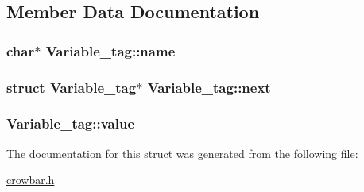 \subsection{Member Data Documentation}
\hypertarget{struct_variable__tag_a1af2d16a129d37300d04c8a182e73d2b}{}
\subsubsection[{name}]{\setlength{\rightskip}{0pt plus 5cm}char$\ast$ Variable\+\_\+tag\+::name}\label{struct_variable__tag_a1af2d16a129d37300d04c8a182e73d2b}
\hypertarget{struct_variable__tag_ae8081b0ed51372eaf9b8df2bb669f7a5}{}
\subsubsection[{next}]{\setlength{\rightskip}{0pt plus 5cm}struct {\bf Variable\+\_\+tag}$\ast$ Variable\+\_\+tag\+::next}\label{struct_variable__tag_ae8081b0ed51372eaf9b8df2bb669f7a5}
\hypertarget{struct_variable__tag_a28da53976be439d10306ef7de2869cd9}{}
\subsubsection[{value}]{ Variable\+\_\+tag\+::value}\label{struct_variable__tag_a28da53976be439d10306ef7de2869cd9}


The documentation for this struct was generated from the following file\+:\begin{DoxyCompactItemize}
\item 
\hyperlink{crowbar_8h}{crowbar.\+h}\end{DoxyCompactItemize}

